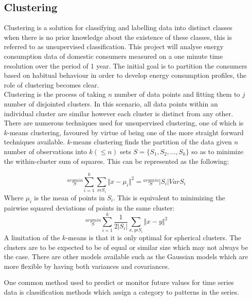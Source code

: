 \subsection{Clustering}
Clustering is a solution for classifying and labelling data into distinct classes when there is no prior knowledge about the existence of these classes, this is referred to as unsupervised classification. This project will analyse energy consumption data of domestic consumers measured on a one minute time resolution over the period of 1 year. The initial goal is to partition the consumers based on habitual behaviour in order to develop energy consumption profiles, the role of clustering becomes clear. \\
Clustering is the process of taking $n$ number of data points and fitting them to $j$ number of disjointed clusters. In this scenario, all data points within an individual cluster are similar however each cluster is distinct from any other. There are numerous techniques used for unsupervised clustering, one of which is $k$-means clustering, favoured by virtue of being one of the more straight forward techniques available. $k$-means clustering finds the partition of the data given $n$ number of observations into $k (\leq n)$ sets $S = \{S_1,S_2, \dots, S_k\}$ so as to minimize the within-cluster sum of squares. This can be represented as the following:

\begin{equation}
\stackrel{arg min}{_{S}} \sum_{i=1}^k \sum_{x \epsilon S_{i}} \Vert x-\mu_{i} \Vert ^{2} = \stackrel{arg min}{_{S}}  |S_{i}|  Var S_{i}
\end{equation}
Where $\mu_{i}$ is the mean of points in $S_i$. This is equivalent to minimizing the pairwise squared deviations of points in the same cluster:
\begin{equation}
\stackrel{arg min}{_{S}} \sum_{i=1}^k \frac{1}{2|S_i|} \sum_{x, y\epsilon S_i}\Vert x- y \Vert ^2
\end{equation}
A limitation of the $k$-means is that it is only optimal for spherical clusters. The clusters are to be expected to be of equal or similar size which may not always be the case. There are other models available such as the Gaussian models which are more flexible by having both variances and covariances.

One common method used to predict or monitor future values for time series data is classification methods which assign a category to patterns in the series. 

